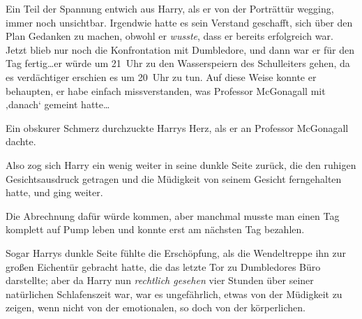 Ein Teil der Spannung entwich aus Harry, als er von der Porträttür wegging, immer noch unsichtbar. Irgendwie hatte es sein Verstand geschafft, sich über den Plan Gedanken zu machen, obwohl er \emph{wusste}, dass er bereits erfolgreich war. Jetzt blieb nur noch die Konfrontation mit Dumbledore, und dann war er für den Tag fertig…er würde um 21~Uhr zu den Wasserspeiern des Schulleiters gehen, da es verdächtiger erschien es um 20~Uhr zu tun. Auf diese Weise konnte er behaupten, er habe einfach missverstanden, was Professor McGonagall mit ‚danach‘ gemeint hatte…

Ein obskurer Schmerz durchzuckte Harrys Herz, als er an Professor McGonagall dachte.

Also zog sich Harry ein wenig weiter in seine dunkle Seite zurück, die den ruhigen Gesichtsausdruck getragen und die Müdigkeit von seinem Gesicht ferngehalten hatte, und ging weiter.

Die Abrechnung dafür würde kommen, aber manchmal musste man einen Tag komplett auf Pump leben und konnte erst am nächsten Tag bezahlen.

\later

Sogar Harrys dunkle Seite fühlte die Erschöpfung, als die Wendeltreppe ihn zur großen Eichentür gebracht hatte, die das letzte Tor zu Dumbledores Büro darstellte; aber da Harry nun \emph{rechtlich gesehen} vier Stunden über seiner natürlichen Schlafenszeit war, war es ungefährlich, etwas von der Müdigkeit zu zeigen, wenn nicht von der emotionalen, so doch von der körperlichen.

